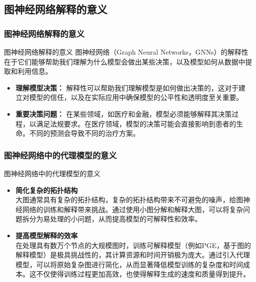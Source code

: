 \documentclass[UTF8, aspectratio=169,10pt]{beamer}%
\numberwithin{equation}{section}
\numberwithin{figure}{section}
\numberwithin{table}{section}
\theoremstyle{definition}
\begin{document}
\subsection{图神经网络解释的意义}
\subsubsection{图神经网络解释的意义}

\begin{frame}{图神经网络解释的意义}
	图神经网络（Graph Neural Networks，GNNs）的解释性在于它们能够帮助我们理解为什么模型会做出某些决策，以及模型如何从数据中提取和利用信息。
	\begin{itemize}
	\item \textbf{理解模型决策：}
		解释性可以帮助我们理解模型是如何做出决策的，这对于建立对模型的信任，以及在实际应用中确保模型的公平性和透明度至关重要。
		
		
	\item \textbf{重要决策问题：}
		在某些领域，如医疗和金融，模型必须能够解释其决策过程，以满足法规要求。在医疗领域，模型的决策可能会直接影响到患者的生命。不同的预测会导致不同的治疗方案。
		
	\end{itemize}
	
	
	
\end{frame}


\subsubsection{图神经网络中的代理模型的意义}
\begin{frame}{图神经网络中的代理模型的意义}
	\begin{itemize}

		\item \textbf{简化复杂的拓扑结构} \\
		大图通常具有复杂的拓扑结构，复杂的拓扑结构带来不可避免的噪声，给图神经网络的训练和解释带来挑战。通过使用小图分解和解释大图，可以将复杂问题拆分为易处理的小问题，从而提高模型的可解释性和效率。
		
		\item \textbf{提高模型解释的效率}\\
		在处理具有数万个节点的大规模图时，训练可解释模型（例如PGE，基于图的解释模型）是极具挑战性的，其计算资源和时间开销极为庞大。通过引入代理模型，可以将原始复杂图进行简化，从而显著降低模型训练的复杂度和时间成本。这不仅使得训练过程更加高效，也使得解释生成的速度和质量得到提升。
		

	\end{itemize}
\end{frame}
\end{document}
